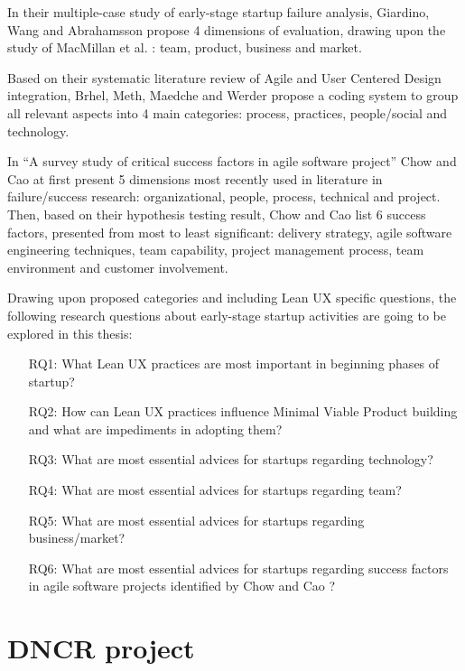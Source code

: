 \documentclass{article}
\begin{document}
In their multiple-case study of early-stage startup failure analysis, Giardino, Wang and Abrahamsson \cite{giardino2014early} propose 4 dimensions of evaluation, drawing upon the study of MacMillan et al. \cite{macmillan1987criteria}: team, product, business and market.

Based on their systematic literature review of Agile and User Centered Design integration, Brhel, Meth, Maedche and Werder \cite{brhel2015exploring} propose a coding system to group all relevant aspects into 4 main categories: process, practices, people/social and technology.

In ``A survey study of critical success factors in agile software project'' Chow and Cao \cite{cao2008agile} at first present 5 dimensions most recently used in literature in failure/success research: organizational, people, process, technical and project. Then, based on their hypothesis testing result, Chow and Cao list 6 success factors, presented from most to least significant: delivery strategy, agile software engineering techniques, team capability, project management process, team environment and customer involvement.

Drawing upon proposed categories and including Lean UX specific questions, the following research questions about early-stage startup activities are going to be explored in this thesis:

\begin{itemize}
\item[RQ1:] What Lean UX practices are most important in beginning phases of startup?
\item[RQ2:] How can Lean UX practices influence Minimal Viable Product building and what are impediments in adopting them?
\item[RQ3:] What are most essential advices for startups regarding technology?
\item[RQ4:] What are most essential advices for startups regarding team?
\item[RQ5:] What are most essential advices for startups regarding business/market?
\item[RQ6:] What are most essential advices for startups regarding success factors in agile software projects identified by Chow and Cao \cite{cao2008agile}?
\end{itemize}

\section{DNCR project}
\label{sec:dncr-project}
\end{document}
